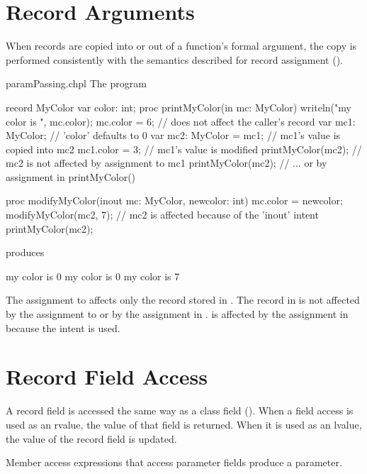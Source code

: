 \section{Record Arguments}
\label{Record_Arguments}

When records are copied into or out of a function's formal argument,
the copy is performed consistently with the semantics described for
record assignment ().

\begin{chapelexample}{paramPassing.chpl}
The program
\begin{chapel}
record MyColor {
  var color: int;
}
proc printMyColor(in mc: MyColor) {
  writeln("my color is ", mc.color);
  mc.color = 6;   // does not affect the caller's record
}
var mc1: MyColor;        // 'color' defaults to 0
var mc2: MyColor = mc1;  // mc1's value is copied into mc2
mc1.color = 3;           // mc1's value is modified
printMyColor(mc2);       // mc2 is not affected by assignment to mc1
printMyColor(mc2);       // ... or by assignment in printMyColor()

proc modifyMyColor(inout mc: MyColor, newcolor: int) {
  mc.color = newcolor;
}
modifyMyColor(mc2, 7);   // mc2 is affected because of the 'inout' intent
printMyColor(mc2);
\end{chapel}
produces
\begin{chapelprintoutput}{}
my color is 0
my color is 0
my color is 7
\end{chapelprintoutput}
The assignment to  affects only the record stored
in . The record in  is not affected by
the assignment to  or by the assignment in .
 is affected by the assignment in 
because the intent  is used.
\end{chapelexample}

\section{Record Field Access}
\label{Record_Field_Access}

A record field is accessed the same way as a class field
().  When a field access is used as an
rvalue, the value of that field is returned.  When it is used as
an lvalue, the value of the record field is updated.

Member access expressions that access parameter fields
produce a parameter.


